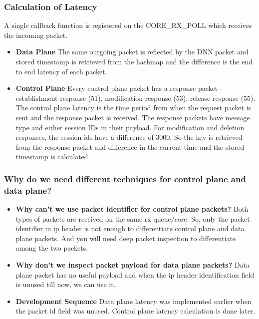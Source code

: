 \documentclass{article}
\begin{document}
\subsubsection{Calculation of Latency}
A single callback function is registered on the CORE\_RX\_POLL which  receives the incoming packet.
\begin{itemize}
    \item \textbf{Data Plane} The same outgoing packet is reflected by the DNN packet and stored timestamp is retrieved from the hashmap and the difference is the end to end latency of each packet.
    \item \textbf{Control Plane} Every control plane packet has a response packet - establishment response (51), modification response (53), release response (55). The control plane latency is the time period from when the request packet is sent and the response packet is received.
          The response packets have message type and either session IDs in their payload. For modification and deletion  responses, the session ids have a difference of 3000. So the key is retrieved from the response packet and difference in the current time and the stored timestamp is calculated.
\end{itemize}
\subsubsection{Why do we need different techniques for control plane and data plane?}
\begin{itemize}
    \item \textbf{Why can't we use packet identifier for control plane packets?}
          Both types of packets are received on the same rx queue/core. So, only the packet identifier in ip header is not enough to differentiate control plane and data plane packets. And you will need deep packet inspection to differentiate among the two packets.
    \item \textbf{Why don't we inspect packet payload for data plane packets?} Data plane packet has no useful payload and when the ip header identification field is unused till now, we can use it.
          \item \textbf{Development Sequence}
          Data plane latency was implemented earlier when the packet id field was unused. Control plane latency calculation is done later.
\end{itemize}
\end{document}
